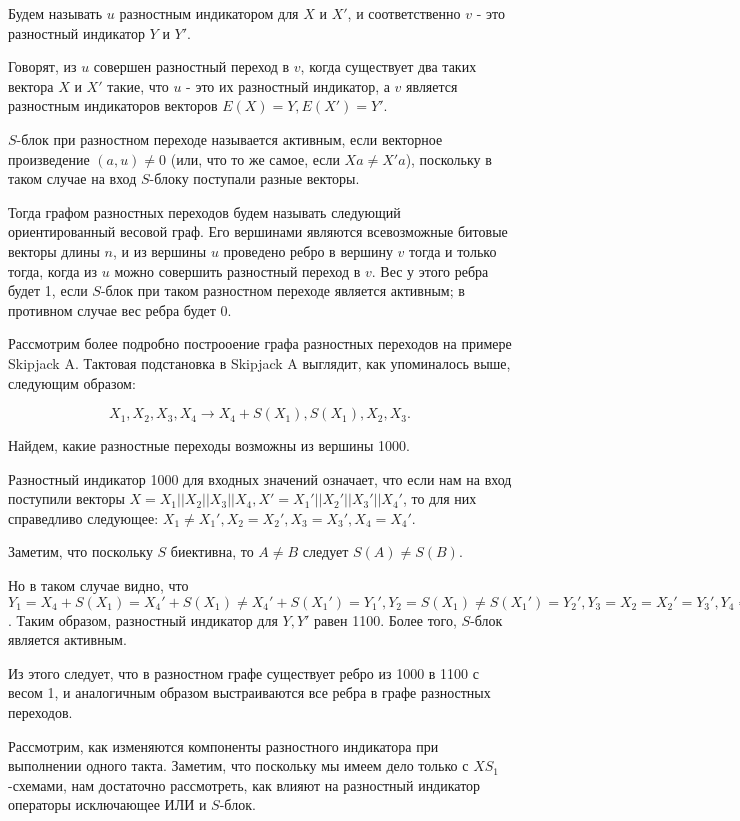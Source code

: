\documentclass[a4paper,12pt]{report}
\theoremstyle{plain} %
\theoremstyle{definition}
\theoremstyle{remark}
\begin{document}
\begin{large}
Будем называть $u$ разностным индикатором для $X$ и $X'$, и соответственно $v$ - это разностный индикатор $Y$ и $Y'$.

Говорят, из $u$ совершен разностный переход в $v$, когда существует два таких вектора $X$ и $X'$ такие, что $u$ - это их разностный индикатор, а $v$ является разностным индикаторов векторов $E(X) = Y, E(X') = Y'$.

$S$-блок при разностном переходе называется активным, если векторное произведение $(a, u) \neq 0$ (или, что то же самое, если $Xa \neq X'a$), поскольку в таком случае на вход $S$-блоку поступали разные векторы.

Тогда графом разностных переходов будем называть следующий ориентированный весовой граф. Его вершинами являются всевозможные битовые векторы длины $n$, и из вершины $u$ проведено ребро в вершину $v$ тогда и только тогда, когда из $u$ можно совершить разностный переход в $v$. Вес у этого ребра будет 1, если $S$-блок при таком разностном переходе является активным; в противном случае вес ребра будет 0.

Рассмотрим более подробно построоение графа разностных переходов на примере Skipjack A. Тактовая подстановка в Skipjack A выглядит, как упоминалось выше, следующим образом:

$$X_1, X_2, X_3, X_4 \rightarrow X_4 + S(X_1), S(X_1), X_2, X_3.$$

Найдем, какие разностные переходы возможны из вершины 1000.

Разностный индикатор 1000 для входных значений означает, что если нам на вход поступили векторы $X=X_1||X_2||X_3||X_4, X'=X_1'||X_2'||X_3'||X_4'$, то для них справедливо следующее: $X_1\neq X_1', X_2=X_2', X_3 = X_3', X_4 = X_4'$. 

Заметим, что поскольку $S$ биективна, то $A \neq B$ следует $S(A) \neq S(B)$.

Но в таком случае видно, что $Y_1=X_4 + S(X_1)=X_4' + S(X_1)\neq X_4' + S(X_1')=Y_1', Y_2=S(X_1)\neq S(X_1')=Y_2', Y_3=X_2=X_2'=Y_3', Y_4=X_3= X_3'=Y_4'$. Таким образом, разностный индикатор для $Y, Y'$ равен 1100. Более того, $S$-блок является активным.

Из этого следует, что в разностном графе существует ребро из 1000 в 1100 с весом 1, и аналогичным образом выстраиваются все ребра в графе разностных переходов.

Рассмотрим, как изменяются компоненты разностного индикатора при выполнении одного такта. Заметим, что поскольку мы имеем дело только с $XS_1$-схемами, нам достаточно рассмотреть, как влияют на разностный индикатор операторы исключающее ИЛИ и $S$-блок.



\end{large}
\end{document}
